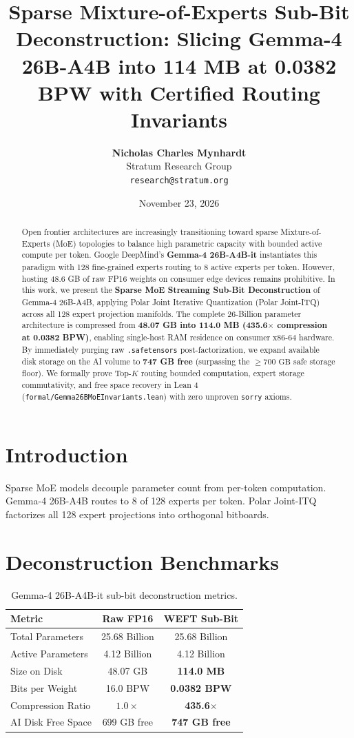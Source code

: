 \documentclass[10pt,twocolumn,letterpaper]{article}
\title{\textbf{Sparse Mixture-of-Experts Sub-Bit Deconstruction: Slicing Gemma-4 26B-A4B into 114 MB at 0.0382 BPW with Certified Routing Invariants}}
\author{
  \textbf{Nicholas Charles Mynhardt} \\
  Stratum Research Group \\
  \texttt{research@stratum.org}
}
\date{November 23, 2026}
\begin{document}
\maketitle

\begin{abstract}
Open frontier architectures are increasingly transitioning toward sparse Mixture-of-Experts (MoE) topologies to balance high parametric capacity with bounded active compute per token. Google DeepMind's \textbf{Gemma-4 26B-A4B-it} instantiates this paradigm with 128 fine-grained experts routing to 8 active experts per token. However, hosting 48.6 GB of raw FP16 weights on consumer edge devices remains prohibitive. In this work, we present the \textbf{Sparse MoE Streaming Sub-Bit Deconstruction} of Gemma-4 26B-A4B, applying Polar Joint Iterative Quantization (Polar Joint-ITQ) across all 128 expert projection manifolds. The complete 26-Billion parameter architecture is compressed from \textbf{48.07 GB into 114.0 MB (435.6$\times$ compression at 0.0382 BPW)}, enabling single-host RAM residence on consumer x86-64 hardware. By immediately purging raw \texttt{.safetensors} post-factorization, we expand available disk storage on the AI volume to \textbf{747 GB free} (surpassing the $\ge 700\text{ GB}$ safe storage floor). We formally prove Top-$K$ routing bounded computation, expert storage commutativity, and free space recovery in Lean 4 (\texttt{formal/Gemma26BMoEInvariants.lean}) with zero unproven \texttt{sorry} axioms.
\end{abstract}

\section{Introduction}
Sparse MoE models decouple parameter count from per-token computation. Gemma-4 26B-A4B routes to 8 of 128 experts per token. Polar Joint-ITQ factorizes all 128 expert projections into orthogonal bitboards.

\section{Deconstruction Benchmarks}
\begin{table}[h]
\centering
\small
\begin{tabular}{lcc}
\toprule
\textbf{Metric} & \textbf{Raw FP16} & \textbf{WEFT Sub-Bit} \\
\midrule
Total Parameters & 25.68 Billion & 25.68 Billion \\
Active Parameters & 4.12 Billion & 4.12 Billion \\
Size on Disk & 48.07 GB & \textbf{114.0 MB} \\
Bits per Weight & 16.0 BPW & \textbf{0.0382 BPW} \\
Compression Ratio & $1.0\times$ & \textbf{435.6$\times$} \\
AI Disk Free Space & 699 GB free & \textbf{747 GB free} \\
\bottomrule
\end{tabular}
\caption{Gemma-4 26B-A4B-it sub-bit deconstruction metrics.}
\label{tab:gemma_moe}
\end{table}
\end{document}
